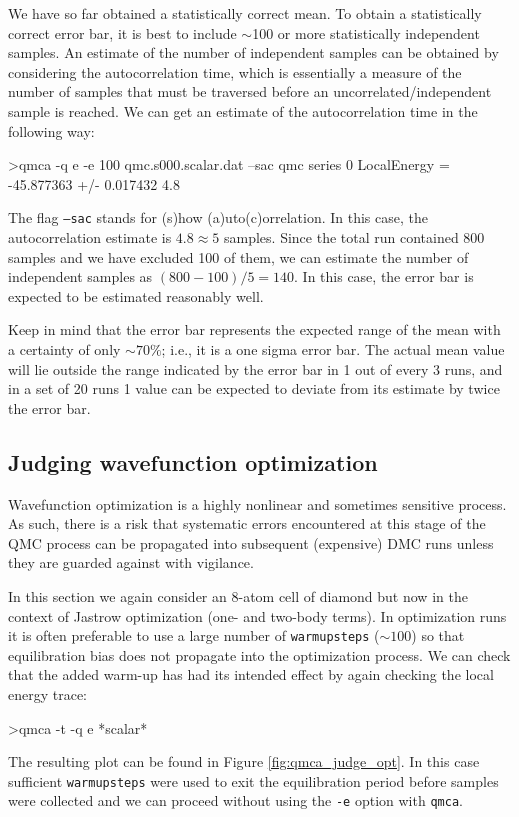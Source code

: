 We have so far obtained a statistically correct mean.  To obtain 
a statistically correct error bar, it is best to include $\sim$100 or more 
statistically independent samples.  An estimate of the number 
of independent samples can be obtained by considering the 
autocorrelation time, which is essentially a measure of the number of 
samples that must be traversed before an uncorrelated/independent sample 
is reached.  We can get an estimate of the autocorrelation time 
in the following way:
\begin{shade}
>qmca -q e -e 100 qmc.s000.scalar.dat --sac
qmc  series 0  LocalEnergy           =  -45.877363 +/- 0.017432    4.8 
\end{shade}
\noindent
The flag \texttt{--sac} stands for (s)how (a)uto(c)orrelation.  
In this case, the autocorrelation estimate is $4.8\approx 5$ samples. 
Since the total run contained 800 samples and we have excluded 100 of 
them, we can estimate the number of independent samples as 
$(800-100)/5=140$.  In this case, the error bar is expected to be 
estimated reasonably well.

Keep in mind that the error bar represents the expected range
of the mean with a certainty of only $\sim 70\%$; i.e., it is a one
sigma error bar.  The actual mean value will lie outside the range
indicated by the error bar in 1 out of every 3 runs, and in a set
of 20 runs 1 value can be expected to deviate from its estimate by
twice the error bar.


\subsection{Judging wavefunction optimization}
\label{sec:qmca_judge_opt}
Wavefunction optimization is a highly nonlinear and sometimes 
sensitive process.  As such, there is a risk that systematic 
errors encountered at this stage of the QMC process can be propagated 
into subsequent (expensive) DMC runs unless they are guarded against 
with vigilance.

In this section we again consider an 8-atom cell of diamond but 
now in the context of Jastrow optimization (one- and two-body terms). 
In optimization runs it is often preferable to use a large number 
of \texttt{warmupsteps} ($\sim 100$) so that equilibration bias does 
not propagate into the optimization process.  We can check that 
the added warm-up has had its intended effect by again checking the 
local energy trace:
\begin{shade}
>qmca -t -q e *scalar*
\end{shade}
\noindent
The resulting plot can be found in Figure \ref{fig:qmca_judge_opt}. 
In this case sufficient \texttt{warmupsteps} were used to exit 
the equilibration period before samples were collected and we can 
proceed without using the \texttt{-e} option with \texttt{qmca}.

